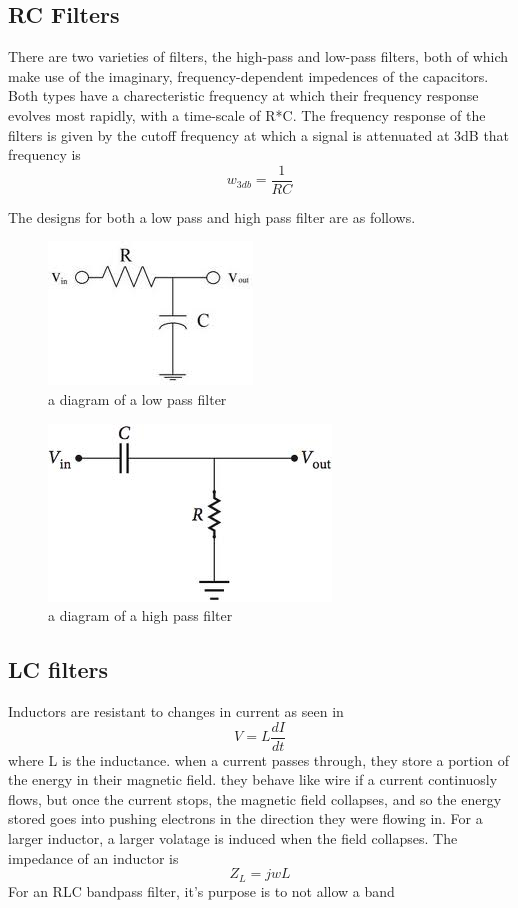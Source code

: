 \documentclass[12 pt]{article}
\begin{document}
\subsection{RC Filters}
There are two varieties of filters, the high-pass and low-pass filters,
both of which make use of the imaginary, frequency-dependent impedences
of the capacitors. Both types have a charecteristic frequency at which
their frequency response evolves most rapidly, with a time-scale of
R*C. The frequency response of the filters is given by the cutoff
frequency at which a signal is attenuated at 3dB that frequency is
\begin{equation}
  \label{3dB frequency}
  w_{3db} =\frac{1}{RC}
\end{equation}

The designs for both a low pass and high pass filter are as follows.
\begin{figure}[H]
\center
\includegraphics[scale=.75]{Rc_lowpass.png}
\caption{a diagram of a low pass filter}
\label{low-pass filter}
\end{figure}

\begin{figure}[H]
\center
\includegraphics[scale=.6]{Rc_hipass.png}
\caption{a diagram of a high pass filter}
\label{high-pass filter}
\end{figure}

\subsection{LC filters}
Inductors are resistant to changes in current as seen in 
\begin{equation}
  \label{inductance voltage}
  V = L \frac{dI}{dt}
\end{equation}
where L is the inductance. when a current passes through, they store a
portion of the energy in their magnetic field. they behave like wire if
a current continuosly flows,  but once the current stops, the magnetic
field collapses, and so the energy stored goes into pushing electrons in
the direction they were flowing in. For a larger inductor, a larger
volatage is induced when the field collapses. The impedance of an
inductor is 
\begin{equation}
  \label{inductor impedance}
  Z_L = jwL
\end{equation}
For an RLC bandpass filter, it's purpose is to not allow a band 
\end{document}

